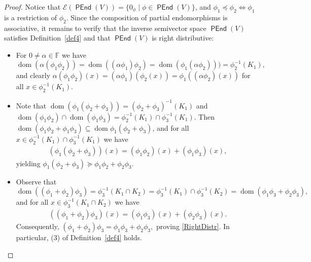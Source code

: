 \documentclass[10pt,a4paper]{amsart}
\theoremstyle{definition}
\theoremstyle{remark}
\numberwithin{equation}{section}
\newtheorem*{Theorem A}{\textbf{Theorem A}}
\newtheorem*{Corollary E}{\textbf{Corollary E}}
\newtheorem*{Corollary F}{\textbf{Corollary F}}
\newtheorem*{Theorem B}{\textbf{Theorem B}}
\newtheorem*{Theorem C}{\textbf{Theorem C}}
\newtheorem*{Theorem D}{\textbf{Theorem B}}
\newtheorem*{p a}{\textbf{Proof of  Theorem A}}
\newtheorem*{p b}{\textbf{Proof of Theorem B}}
\newtheorem*{p c}{\textbf{Proof of  Theorem C}}
\newtheorem*{p d}{\textbf{Proof of  Theorem D}}
\newcommand{\E}{\mathcal{E}}
\newcommand{\0}{{\vartheta}}
\DeclareMathOperator{\dom}{dom}
\DeclareMathOperator{\pen}{\textsf{PEnd}}
\begin{document}
\begin{proof}
Notice that $\E(\pen(V))=\{0_\phi\mid \phi\in \pen(V)\}$, and $\phi_1\preceq \phi_2\Longleftrightarrow \phi_1$ is a restriction of $\phi_2$. Since the composition of partial endomorphisms is associative, it remains to  verify that the inverse semivector space $\pen(V)$ satisfies Definition~\ref{def4} and that $\pen(V)$ is right distributive:
\begin{itemize}
\item[(1)] For  $ 0\neq \alpha \in \mathbb{F}$ we have $$\dom (\alpha (\phi_1 \phi_2))=\dom ((\alpha \phi_1)\phi_2)=\dom (\phi_1 (\alpha \phi_2)))=\phi_2^{-1}(K_1),$$
and clearly 
 $\alpha (\phi_1\phi_2)(x)=(\alpha \phi_1)(\phi_2 (x))=  \phi_1((\alpha \phi_2)(x))$ for all $x\in \phi_2^{-1}(K_1).$
\item[(2)] Note that $\dom(\phi_1 ( \phi_2+\phi_3))= (\phi_2+ \phi_3)^{-1} (K_1)$ and $ \dom
             (\phi_1\phi_2)\cap \dom ( \phi_1\phi_3)=
                          \phi_2^{-1}(K_1)\cap \phi_3^{-1}(K_1).$ Then $\dom (\phi_1\phi_2+ \phi_1  \phi_3 )\subseteq \dom\phi_1( \phi_2+\phi_3) $, and for all $x\in \phi_2^{-1}(K_1)\cap \phi_3^{-1}(K_1)$ we have 
  \begin{align*}
      ( \phi_1  (\phi_2+\phi_3))(x)=       
        (\phi_1 \phi_2)(x)+( \phi_1\phi_3) (x),     \end{align*}
yielding $\phi_1( \phi_2+\phi_3)\succeq \phi_1\phi_2+\phi_2  \phi_3.$
       \item[$(3)$] Observe that $$\dom (( \phi_1+\phi_2)\phi_3 )= \phi_3^{-1} (K_1\cap K_2)=\phi_3^{-1}(K_1)\cap\phi_3^{-1}(K_2)=\dom(\phi_1\phi_3+\phi_2\phi_3),$$ and for all $x\in\phi_3^{-1} (K_1\cap K_2)$ we have 
       \begin{align*}
      ((\phi_1+\phi_2)\phi_3)(x)=(\phi_1 \phi_3)(x)+( \phi_2\phi_3) (x).      
                \end{align*}
 Consequently, $ ( \phi_1+\phi_2)\phi_3= \phi_1\phi_3+\phi_2\phi_3,$ proving  \eqref{RightDistr}.  In particular, (3) of Definition~\ref{def4} holds. 



\end{itemize}
\end{proof}
\end{document}
